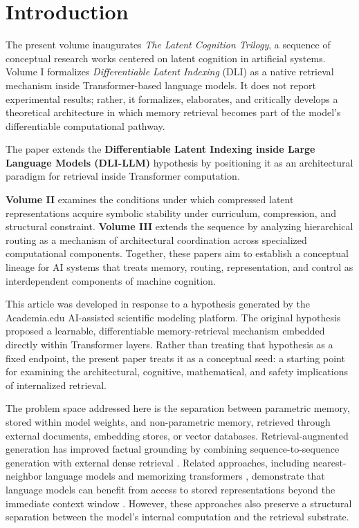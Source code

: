 \section*{Introduction}

The present volume inaugurates \textit{The Latent Cognition Trilogy}, a sequence of conceptual research works centered on latent cognition in artificial systems. Volume I formalizes \textit{Differentiable Latent Indexing} (DLI) as a native retrieval mechanism inside Transformer-based language models. It does not report experimental results; rather, it formalizes, elaborates, and critically develops a theoretical architecture in which memory retrieval becomes part of the model's differentiable computational pathway.

The paper extends the \textbf{Differentiable Latent Indexing inside Large Language Models (DLI-LLM)} hypothesis by positioning it as an architectural paradigm for retrieval inside Transformer computation. 

\textbf{Volume II} examines the conditions under which compressed latent representations acquire symbolic stability under curriculum, compression, and structural constraint. \textbf{Volume III} extends the sequence by analyzing hierarchical routing as a mechanism of architectural coordination across specialized computational components. Together, these papers aim to establish a conceptual lineage for AI systems that treats memory, routing, representation, and control as interdependent components of machine cognition.

This article was developed in response to a hypothesis generated by the Academia.edu AI-assisted scientific modeling platform. The original hypothesis proposed a learnable, differentiable memory-retrieval mechanism embedded directly within Transformer layers. Rather than treating that hypothesis as a fixed endpoint, the present paper treats it as a conceptual seed: a starting point for examining the architectural, cognitive, mathematical, and safety implications of internalized retrieval.

The problem space addressed here is the separation between parametric memory, stored within model weights, and non-parametric memory, retrieved through external documents, embedding stores, or vector databases. Retrieval-augmented generation has improved factual grounding by combining sequence-to-sequence generation with external dense retrieval \cite{Lewis2021}. Related approaches, including nearest-neighbor language models and memorizing transformers \cite{Wu2022}, demonstrate that language models can benefit from access to stored representations beyond the immediate context window \cite{Khandelwal2020, Wu2022}. However, these approaches also preserve a structural separation between the model's internal computation and the retrieval substrate.

